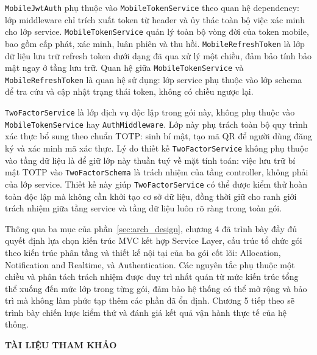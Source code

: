 ﻿\documentclass[a4paper,12pt,openany,oneside]{report}
\begin{document}
\texttt{MobileJwtAuth} phụ thuộc vào \texttt{MobileTokenService} theo quan hệ
dependency: lớp middleware chỉ trích xuất token từ header và ủy thác toàn bộ
việc xác minh cho lớp service. \texttt{MobileTokenService} quản lý toàn bộ vòng
đời của token mobile, bao gồm cấp phát, xác minh, luân phiên và thu hồi.
\texttt{MobileRefreshToken} là lớp dữ liệu lưu trữ refresh token dưới dạng đã
qua xử lý một chiều, đảm bảo tính bảo mật ngay ở tầng lưu trữ. Quan hệ giữa
\texttt{MobileTokenService} và \texttt{MobileRefreshToken} là quan hệ sử dụng:
lớp service phụ thuộc vào lớp schema để tra cứu và cập nhật trạng thái token,
không có chiều ngược lại.

\texttt{TwoFactorService} là lớp dịch vụ độc lập trong gói này, không phụ thuộc
vào \texttt{MobileTokenService} hay \texttt{AuthMiddleware}. Lớp này phụ trách
toàn bộ quy trình xác thực bổ sung theo chuẩn TOTP: sinh bí mật, tạo mã QR để
người dùng đăng ký và xác minh mã xác thực. Lý do thiết kế \texttt{TwoFactorService}
không phụ thuộc vào tầng dữ liệu là để giữ lớp này thuần tuý về mặt tính toán:
việc lưu trữ bí mật TOTP vào \texttt{TwoFactorSchema} là trách nhiệm của tầng
controller, không phải của lớp service. Thiết kế này giúp \texttt{TwoFactorService}
có thể được kiểm thử hoàn toàn độc lập mà không cần khởi tạo cơ sở dữ liệu,
đồng thời giữ cho ranh giới trách nhiệm giữa tầng service và tầng dữ liệu luôn
rõ ràng trong toàn gói.

Thông qua ba mục của phần~\ref{sec:arch_design}, chương 4 đã trình bày đầy đủ
quyết định lựa chọn kiến trúc MVC kết hợp Service Layer, cấu trúc tổ chức gói
theo kiến trúc phân tầng và thiết kế nội tại của ba gói cốt lõi: Allocation,
Notification and Realtime, và Authentication. Các nguyên tắc phụ thuộc một chiều
và phân tách trách nhiệm được duy trì nhất quán từ mức kiến trúc tổng thể xuống
đến mức lớp trong từng gói, đảm bảo hệ thống có thể mở rộng và bảo trì mà không
làm phức tạp thêm các phần đã ổn định. Chương 5 tiếp theo sẽ trình bày chiến
lược kiểm thử và đánh giá kết quả vận hành thực tế của hệ thống.

\clearpage
\begin{center}
    {\bfseries\fontsize{18pt}{22pt}\selectfont TÀI LIỆU THAM KHẢO}
\end{center}
\vspace{1cm}
\end{document}

